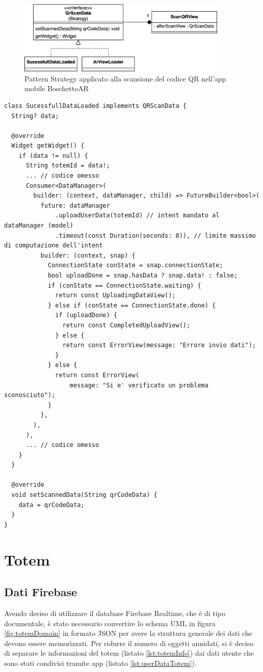 \begin{figure}
  \centering
  \includegraphics[width=10cm]{img/app/startegyScanQR.png}
  \caption{Pattern Strategy applicato alla scansione del codice QR nell'app mobile BoschettoAR}
  \label{fig:strategyQRScan}
\end{figure}

 \begin{lstlisting}[style=FlutterStyle, caption={Codice rilevante della classe \texttt{SucessfullDataLoaded}.}, label={lst:SucessfullDataLoaded}]
  class SucessfullDataLoaded implements QRScanData {
  String? data;

  @override
  Widget getWidget() {
    if (data != null) {
      String totemId = data!;
      ... // codice omesso 
      Consumer<DataManager>(
        builder: (context, dataManager, child) => FutureBuilder<bool>(
          future: dataManager
              .uploadUserData(totemId) // intent mandato al dataManager (model)
              .timeout(const Duration(seconds: 8)), // limite massimo di computazione dell'intent
          builder: (context, snap) {
            ConnectionState conState = snap.connectionState;
            bool uploadDone = snap.hasData ? snap.data! : false;
            if (conState == ConnectionState.waiting) {
              return const UploadingDataView();
            } else if (conState == ConnectionState.done) {
              if (uploadDone) {
                return const CompletedUploadView();
              } else {
                return const ErrorView(message: "Errore invio dati");
              }
            } else {
              return const ErrorView(
                  message: "Si e' verificato un problema sconosciuto");
            }
          },
        ),
      ),
      ... // codice omesso 
    }
  }

  @override
  void setScannedData(String qrCodeData) {
    data = qrCodeData;
  }
}
\end{lstlisting}
\section{Totem}
\subsection{Dati Firebase}
Avendo deciso di utilizzare il database Firebase Realtime, che è di tipo documentale, è stato necessario convertire lo schema UML in figura \ref{fig:totemDomain} in formato JSON per avere la struttura generale dei dati che devono essere memorizzati.
Per ridurre il numero di oggetti annidati, si è deciso di separare le informazioni del totem (listato \ref{lst:totemInfo}) dai dati utente che sono stati condivisi tramite app (listato \ref{lst:userDataTotem}).

